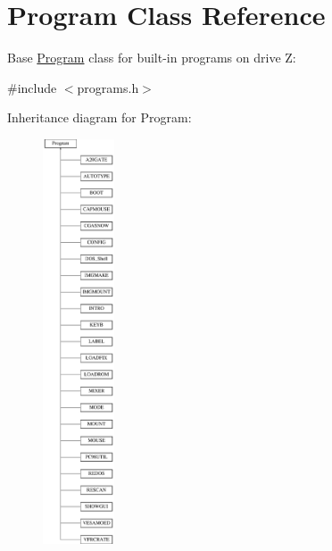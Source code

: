 \hypertarget{classProgram}{\section{Program Class Reference}
\label{classProgram}
}


Base \hyperlink{classProgram}{Program} class for built-\/in programs on drive Z\-:  




{\ttfamily \#include $<$programs.\-h$>$}

Inheritance diagram for Program\-:\begin{figure}[H]
\begin{center}
\leavevmode
\includegraphics[height=12.000000cm]{classProgram}
\end{center}
\end{figure}
